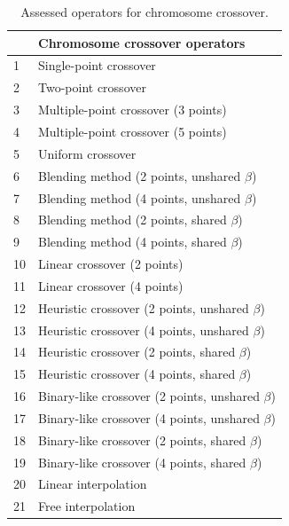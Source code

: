 \documentclass{ametsoc}
\begin{document}
\begin{table}[t]
	\caption{Assessed operators for chromosome crossover.}
	\begin{center}
		\begin{tabular}{ll}
			\hline\hline  & \textbf{Chromosome crossover operators} \\ 
			\hline 
			1 & Single-point crossover \\
			2 & Two-point crossover \\
			3 & Multiple-point crossover (3 points) \\
			4 & Multiple-point crossover (5 points) \\
			5 & Uniform crossover \\
			6 & Blending method (2 points, unshared $\beta$) \\
			7 & Blending method (4 points, unshared $\beta$) \\
			8 & Blending method (2 points, shared $\beta$) \\
			9 & Blending method (4 points, shared $\beta$) \\
			10 & Linear crossover (2 points) \\
			11 & Linear crossover (4 points) \\
			12 & Heuristic crossover (2 points, unshared $\beta$) \\
			13 & Heuristic crossover (4 points, unshared $\beta$) \\
			14 & Heuristic crossover (2 points, shared $\beta$) \\
			15 & Heuristic crossover (4 points, shared $\beta$) \\
			16 & Binary-like crossover (2 points, unshared $\beta$) \\
			17 & Binary-like crossover (4 points, unshared $\beta$) \\
			18 & Binary-like crossover (2 points, shared $\beta$) \\
			19 & Binary-like crossover (4 points, shared $\beta$) \\
			20 & Linear interpolation \\
			21 & Free interpolation \\
			\hline
		\end{tabular}
	\end{center}
	\label{tab:assessed_crossover_operators}
\end{table}
\end{document}
